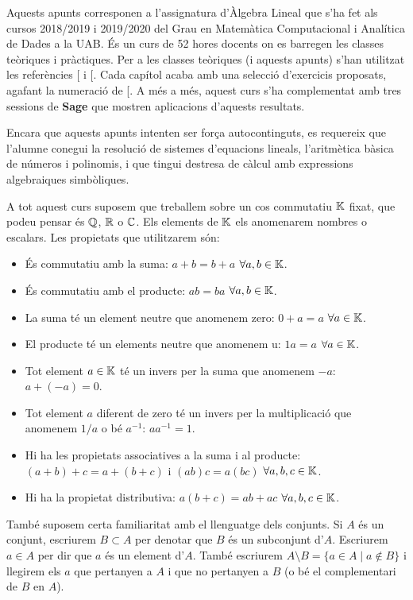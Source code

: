 \documentclass[
  11pt,
]{book}
\numberwithin{dummy}{section}
\theoremstyle{maincolornumbox}
\theoremstyle{blacknumex}
\theoremstyle{blacknumbox}
\theoremstyle{maincolornum}
\newlength\esp
\begin{document}
Aquests apunts corresponen a l'assignatura d'Àlgebra Lineal que s'ha fet
als cursos 2018/2019 i 2019/2020 del Grau en Matemàtica Computacional i
Analítica de Dades a la UAB. És un curs de 52 hores docents on es
barregen les classes teòriques i pràctiques. Per a les classes teòriques
(i aquests apunts) s'han utilitzat les referències {[}\citeproc{ref-Bret}{1}{]} i {[}\citeproc{ref-NaXa}{2}{]}.
Cada capítol acaba amb una selecció d'exercicis proposats, agafant la
numeració de {[}\citeproc{ref-Bret}{1}{]}. A més a més, aquest curs s'ha complementat amb
tres sessions de \textbf{Sage} que mostren aplicacions d'aquests resultats.

Encara que aquests apunts intenten ser força autocontinguts, es
requereix que l'alumne conegui la resolució de sistemes d'equacions
lineals, l'aritmètica bàsica de números i polinomis, i que tingui
destresa de càlcul amb expressions algebraiques simbòliques.

A tot aquest curs suposem que treballem sobre un cos commutatiu \(\mathbb{K}\)
fixat, que podeu pensar és \(\mathbb{Q}\), \(\mathbb{R}\) o \(\mathbb{C}\). Els elements de \(\mathbb{K}\) els
anomenarem nombres o escalars. Les propietats que utilitzarem són:

\begin{itemize}
\item
  És commutatiu amb la suma: \(a+b=b+a\) \(\forall a,b\in \mathbb{K}\).
\item
  És commutatiu amb el producte: \(ab=ba\) \(\forall a,b\in \mathbb{K}\).
\item
  La suma té un element neutre que anomenem zero: \(0+a=a\)
  \(\forall a\in\mathbb{K}\).
\item
  El producte té un elements neutre que anomenem u: \(1a=a\)
  \(\forall a\in\mathbb{K}\).
\item
  Tot element \(a\in\mathbb{K}\) té un invers per la suma que anomenem \(-a\):
  \(a+(-a)=0\).
\item
  Tot element \(a\) diferent de zero té un invers per la multiplicació
  que anomenem \(1/a\) o bé \(a^{-1}\): \(a a^{-1}=1\).
\item
  Hi ha les propietats associatives a la suma i al producte:
  \((a+b)+c=a+(b+c)\) i \((ab)c=a(bc)\) \(\forall a,b,c \in \mathbb{K}\).
\item
  Hi ha la propietat distributiva: \(a(b+c)=ab+ac\)
  \(\forall a,b,c \in \mathbb{K}\).
\end{itemize}

També suposem certa familiaritat amb el llenguatge dels conjunts. Si \(A\)
és un conjunt, escriurem \(B\subset A\) per denotar que \(B\) és un
subconjunt d'\(A\). Escriurem \(a\in A\) per dir que \(a\) és un element
d'\(A\). També escriurem \(A\setminus B=\{a \in A \mid a \not\in B\}\) i
llegirem els \(a\) que pertanyen a \(A\) i que no pertanyen a \(B\) (o bé el
complementari de \(B\) en \(A\)).
\end{document}

